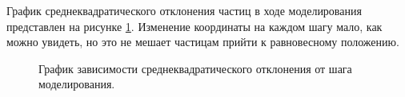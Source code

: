 \documentclass[14pt,a4paper,report]{ncc}
\begin{document}
График среднеквадратического отклонения частиц в ходе моделирования представлен на рисунке \ref{ris:image5}. Изменение координаты на каждом шагу мало, как можно увидеть, но это не мешает частицам прийти к равновесному положению.
\begin{figure}[h]
\caption{График зависимости среднеквадратического отклонения от шага моделирования.}
\label{ris:image5}
\end{figure}
\ 
\end{document}
